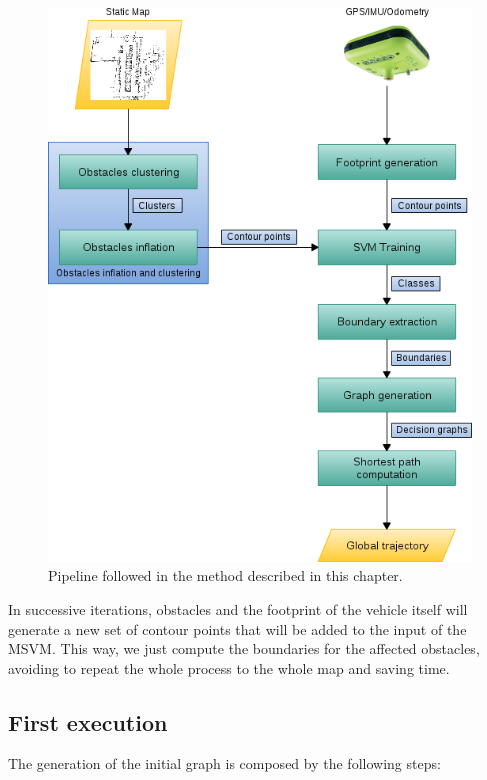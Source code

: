 \begin{figure}[h!]
      \centering
      \includegraphics[width=\textwidth, trim=0 0 0 40,clip]{pipeline}
      \caption{ Pipeline followed in the method described in this chapter. }      
      \label{fig:cp06_pipeline}
\end{figure}

In successive iterations, obstacles and the footprint of the vehicle itself will generate a new set of contour points that will be added to the input of the \ac{MSVM}. This way, we just compute the boundaries for the affected obstacles, avoiding to repeat the whole process to the whole map and saving time.

\subsection{First execution}\label{ch:chapter06_01_01}

The generation of the initial graph is composed by the following steps:

